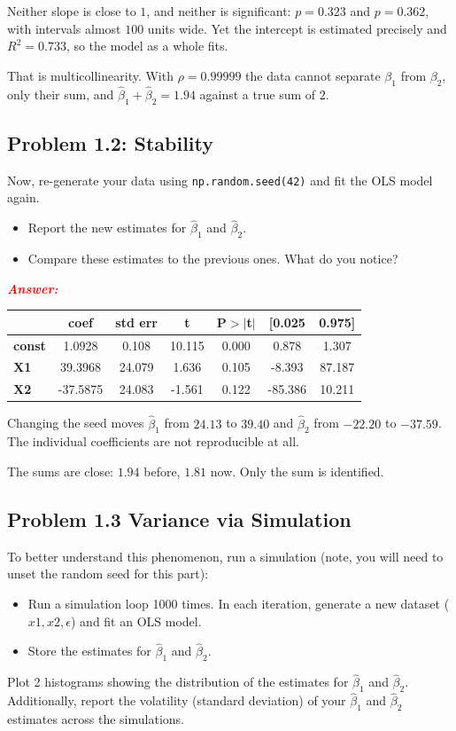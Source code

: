 \documentclass[11pt, letterpaper]{article}
\newcommand{\subproblem}[1]{\subsection*{Problem #1}}
\newcommand{\answer}{\textbf{\textit{\textcolor{red}{Answer:}}}\\}
\begin{document}
Neither slope is close to $1$, and neither is significant: $p = 0.323$ and $p = 0.362$, with
intervals almost $100$ units wide. Yet the intercept is estimated precisely and $R^2 = 0.733$, so
the model as a whole fits.

That is multicollinearity. With $\rho = 0.99999$ the data cannot separate $\beta_1$ from $\beta_2$,
only their sum, and $\hat{\beta}_1 + \hat{\beta}_2 = 1.94$ against a true sum of $2$.


\subproblem{1.2: Stability}
Now, re-generate your data using \texttt{np.random.seed(42)} and fit the OLS model again.
\begin{itemize}
    \item Report the new estimates for $\hat{\beta}_1$ and $\hat{\beta}_2$.
    \item Compare these estimates to the previous ones. What do you notice?
\end{itemize}

\answer
\begin{center}
\begin{tabular}{lcccccc}
\toprule
               & \textbf{coef} & \textbf{std err} & \textbf{t} & \textbf{P$> |$t$|$} & \textbf{[0.025} & \textbf{0.975]}  \\
\midrule
\textbf{const} &       1.0928  &        0.108     &    10.115  &         0.000        &        0.878    &        1.307     \\
\textbf{X1}    &      39.3968  &       24.079     &     1.636  &         0.105        &       -8.393    &       87.187     \\
\textbf{X2}    &     -37.5875  &       24.083     &    -1.561  &         0.122        &      -85.386    &       10.211     \\
\bottomrule
\end{tabular}
\end{center}

Changing the seed moves $\hat{\beta}_1$ from $24.13$ to $39.40$ and $\hat{\beta}_2$ from $-22.20$
to $-37.59$. The individual coefficients are not reproducible at all.

The sums are close: $1.94$ before, $1.81$ now. Only the sum is identified.


\subproblem{1.3 Variance via Simulation}

To better understand this phenomenon, run a simulation (note, you will need to unset the random seed for this part):
\begin{itemize}
    \item Run a simulation loop 1000 times. In each iteration, generate a new dataset ($x1, x2, \epsilon$) and fit an OLS model.
    \item Store the estimates for $\hat{\beta}_1$ and $\hat{\beta}_2$.
\end{itemize}
Plot 2 histograms showing the distribution of the estimates for $\hat{\beta}_1$ and $\hat{\beta}_2$.
Additionally, report the volatility (standard deviation) of your $\hat{\beta}_1$ and $\hat{\beta}_2$ estimates across the simulations.
\end{document}
